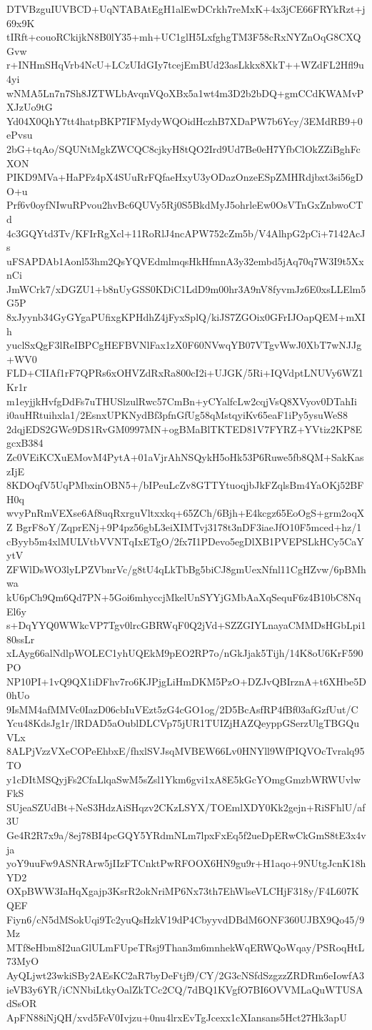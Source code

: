 DTVBzguIUVBCD+UqNTABAtEgH1alEwDCrkh7reMxK+4x3jCE66FRYkRzt+j69x9K
tIRft+couoRCkijkN8B0lY35+mh+UC1glH5LxfghgTM3F58cRxNYZnOqG8CXQGvw
r+INHmSHqVrb4NcU+LCzUIdGIy7tcejEmBUd23asLkkx8XkT++WZdFL2Hfl9u4yi
wNMA5Ln7n7Sh8JZTWLbAvqnVQoXBx5a1wt4m3D2b2bDQ+gmCCdKWAMvPXJzUo9tG
Yd04X0QhY7tt4hatpBKP7IFMydyWQOidHczhB7XDaPW7b6Ycy/3EMdRB9+0ePvsu
2bG+tqAo/SQUNtMgkZWCQC8cjkyH8tQO2Ird9Ud7Be0eH7YfbClOkZZiBghFcXON
PIKD9MVa+HaPFz4pX4SUuRrFQfaeHxyU3yODazOnzeESpZMHRdjbxt3si56gDO+u
Prf6v0oyfNIwuRPvou2hvBc6QUVy5Rj0S5BkdMyJ5ohrleEw0OsVTnGxZnbwoCTd
4c3GQYtd3Tv/KFIrRgXcl+11RoRlJ4ncAPW752cZm5b/V4AlhpG2pCi+7142AcJs
uFSAPDAb1Aonl53hm2QsYQVEdmlmqsHkHfmnA3y32embd5jAq70q7W3I9t5XxnCi
JmWCrk7/xDGZU1+b8nUyGSS0KDiC1LdD9m00hr3A9nV8fyvmJz6E0xsLLElm5G5P
8xJyynb34GyGYgaPUfixgKPHdhZ4jFyxSplQ/kiJS7ZGOix0GFrIJOapQEM+mXIh
yuclSxQgF3lReIBPCgHEFBVNlFax1zX0F60NVwqYB07VTgvWwJ0XbT7wNJJg+WV0
FLD+CIIAf1rF7QPRs6xOHVZdRxRa800cI2i+UJGK/5Ri+IQVdptLNUVy6WZ1Kr1r
m1eyjjkHvfgDdFs7uTHUSlzulRwc57CmBn+yCYalfcLw2cqjVsQ8XVyov0DTahIi
i0auHRtuihxla1/2EsnxUPKNydBf3pfnGfUg58qMstqyiKv65eaF1iPy5ysuWeS8
2dqjEDS2GWc9DS1RvGM0997MN+ogBMaBlTKTED81V7FYRZ+YVtiz2KP8EgcxB384
Zc0VEiKCXuEMovM4PytA+01aVjrAhNSQykH5oHk53P6Ruwe5fb8QM+SakKaszIjE
8KDOqfV5UqPMbxinOBN5+/bIPeuLcZv8GTTYtuoqjbJkFZqlsBm4YaOKj52BFH0q
wvyPnRmVEXse6Af8uqRxrguVltxxkq+65ZCh/6Bjh+E4kcgz65EoOgS+grm2oqXZ
BgrF8oY/ZqprENj+9P4pz56gbL3eiXIMTvj3178t3nDF3iaeJfO10F5mced+hz/1
cByyb5m4xlMULVtbVVNTqIxETgO/2fx7I1PDevo5egDlXB1PVEPSLkHCy5CaYytV
ZFWlDsWO3lyLPZVbnrVc/g8tU4qLkTbBg5biCJ8gmUexNfnl11CgHZvw/6pBMhwa
kU6pCh9Qm6Qd7PN+5Goi6mhyccjMkelUnSYYjGMbAaXqSequF6z4B10bC8NqEl6y
s+DqYYQ0WWkcVP7Tgv0lrcGBRWqF0Q2jVd+SZZGIYLnayaCMMDsHGbLpi180ssLr
xLAyg66alNdlpWOLEC1yhUQEkM9pEO2RP7o/nGkJjak5Tijh/14K8oU6KrF590PO
NP10PI+1vQ9QX1iDFhv7ro6KJPjgLiHmDKM5PzO+DZJvQBIrznA+t6XHbe5D0hUo
9IsMM4afMMVc0IazD06cbIuVEzt5zG4cGO1og/2D5BcAsfRP4fBf03afGzfUut/C
Ycu48KdsJg1r/lRDAD5aOublDLCVp75jUR1TUIZjHAZQeyppGSerzUlgTBGQuVLx
8ALPjVzzVXeCOPeEhbxE/fhxlSVJsqMVBEW66Lv0HNYll9WfPIQVOcTvralq95TO
y1cDItMSQyjFs2CfaLlqaSwM5sZsl1Ykm6gvi1xA8E5kGcYOmgGmzbWRWUvlwFkS
SUjeaSZUdBt+NeS3HdzAiSHqzv2CKzLSYX/TOEmlXDY0Kk2gejn+RiSFhlU/af3U
Ge4R2R7x9a/8ej78BI4pcGQY5YRdmNLm7lpxFxEq5f2ueDpERwCkGmS8tE3x4vja
yoY9uuFw9ASNRArw5jIIzFTCnktPwRFOOX6HN9gu9r+H1aqo+9NUtgJcnK18hYD2
OXpBWW3IaHqXgajp3KsrR2okNriMP6Nx73th7EhWlseVLCHjF318y/F4L607KQEF
Fiyn6/cN5dMSokUqi9Tc2yuQsHzkV19dP4CbyyvdDBdM6ONF360UJBX9Qo45/9Mz
MTf8eHbm8I2uaGlULmFUpeTRsj9Than3m6mnhekWqERWQoWqay/PSRoqHtL73MyO
AyQLjwt23wkiSBy2AEsKC2aR7byDeFtjf9/CY/2G3cNSfdSzgzzZRDRm6eIowfA3
ieVB3y6YR/iCNNbiLtkyOalZkTCc2CQ/7dBQ1KVgfO7BI6OVVMLaQuWTUSAdSsOR
ApFN88iNjQH/xvd5FeV0Ivjzu+0nu4lrxEvTgJcexx1cXIansans5Hct27Hk3apU
